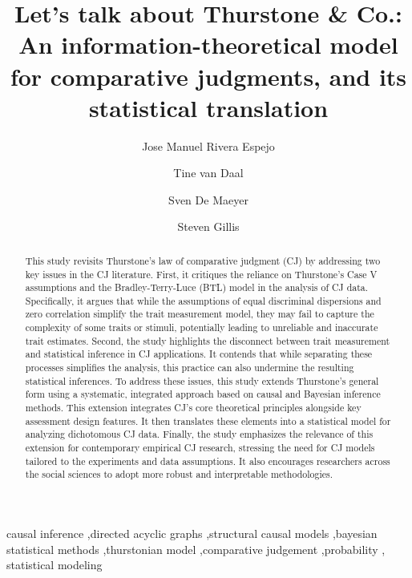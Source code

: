 \documentclass[
  authoryear,
  review,
  1p]{elsarticle}
\begin{document}
\begin{frontmatter}
\title{Let's talk about Thurstone \& Co.: An information-theoretical
model for comparative judgments, and its statistical translation}
\author[1]{Jose Manuel Rivera Espejo%
%
}
\author[1]{Tine van Daal%
%
}
\author[1]{Sven De Maeyer%
%
}
\author[2]{Steven Gillis%
%
}






        
\begin{abstract}
This study revisits Thurstone's law of comparative judgment (CJ) by
addressing two key issues in the CJ literature. First, it critiques the
reliance on Thurstone's Case V assumptions and the Bradley-Terry-Luce
(BTL) model in the analysis of CJ data. Specifically, it argues that
while the assumptions of equal discriminal dispersions and zero
correlation simplify the trait measurement model, they may fail to
capture the complexity of some traits or stimuli, potentially leading to
unreliable and inaccurate trait estimates. Second, the study highlights
the disconnect between trait measurement and statistical inference in CJ
applications. It contends that while separating these processes
simplifies the analysis, this practice can also undermine the resulting
statistical inferences. To address these issues, this study extends
Thurstone's general form using a systematic, integrated approach based
on causal and Bayesian inference methods. This extension integrates CJ's
core theoretical principles alongside key assessment design features. It
then translates these elements into a statistical model for analyzing
dichotomous CJ data. Finally, the study emphasizes the relevance of this
extension for contemporary empirical CJ research, stressing the need for
CJ models tailored to the experiments and data assumptions. It also
encourages researchers across the social sciences to adopt more robust
and interpretable methodologies.
\end{abstract}





\begin{keyword}
    causal inference \sep directed acyclic graphs \sep structural causal
models \sep bayesian statistical methods \sep thurstonian
model \sep comparative judgement \sep probability \sep 
    statistical modeling
\end{keyword}
\end{frontmatter}
    
\end{document}
